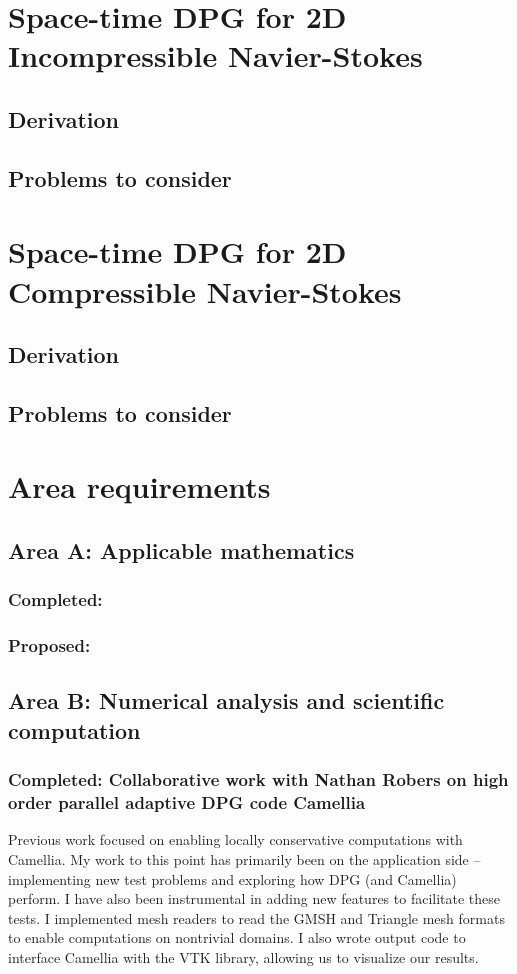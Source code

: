 \documentclass{report}
\begin{document}
\section{Space-time DPG for 2D Incompressible Navier-Stokes}

\subsection{Derivation}

\subsection{Problems to consider}


\section{Space-time DPG for 2D Compressible Navier-Stokes}

\subsection{Derivation}

\subsection{Problems to consider}


\section{Area requirements}

\subsection{Area A: Applicable mathematics}
\subsubsection*{Completed:}
\subsubsection*{Proposed:}

\subsection{Area B: Numerical analysis and scientific computation}
\subsubsection*{Completed: Collaborative work with Nathan Robers on high order parallel adaptive DPG code Camellia}
Previous work focused on enabling locally conservative computations with Camellia. My work to this point has primarily been on the application side -- implementing new test problems and exploring how DPG (and Camellia) perform. I have also been instrumental in adding new features to facilitate these tests. I implemented mesh readers to read the GMSH and Triangle mesh formats to enable computations on nontrivial domains. I also wrote output code to interface Camellia with the VTK library, allowing us to visualize our results.
\end{document}

